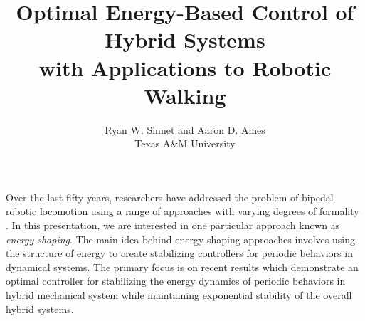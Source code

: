 \documentclass[english]{article}
\begin{document}

\title{Optimal Energy-Based Control of Hybrid Systems\\ with Applications to
  Robotic Walking}

\author{\underline{Ryan W. Sinnet} and Aaron D. Ames \\
  Texas A\&M University}%


\date{}
\maketitle
\thispagestyle{empty}

Over the last fifty years, researchers have addressed the problem of bipedal
robotic locomotion using a range of approaches with varying degrees of
formality \cite{Grizzle2014}.
%
In this presentation, we are interested in one particular approach known as {\em
  energy shaping}.
%
The main idea behind energy shaping approaches involves using the structure
of energy to create stabilizing controllers for periodic behaviors in dynamical
systems.
%
The primary focus is on recent results \cite{Sinnet2015a} which
demonstrate an optimal controller for stabilizing the energy dynamics of
periodic behaviors in hybrid mechanical system while maintaining exponential
stability of the overall hybrid systems.
%
\end{document}
